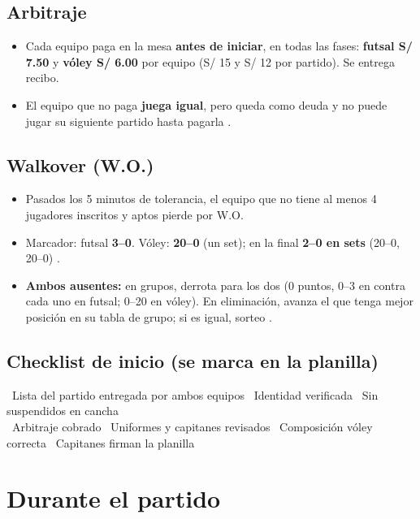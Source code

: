 \subsection{Arbitraje}
\begin{itemize}
	\item Cada equipo paga en la mesa \textbf{antes de iniciar}, en todas las fases: \textbf{futsal S/ 7.50} y \textbf{vóley S/ 6.00} por equipo (S/ 15 y S/ 12 por partido). Se entrega recibo.
	\item El equipo que no paga \textbf{juega igual}, pero queda como deuda y no puede jugar su siguiente partido hasta pagarla .
\end{itemize}

\subsection{Walkover (W.O.)}
\begin{itemize}
	\item Pasados los 5 minutos de tolerancia, el equipo que no tiene al menos 4 jugadores inscritos y aptos pierde por W.O.
	\item Marcador: futsal \textbf{3--0}. Vóley: \textbf{20--0} (un set); en la final \textbf{2--0 en sets} (20--0, 20--0) .
	\item \textbf{Ambos ausentes:} en grupos, derrota para los dos (0 puntos, 0--3 en contra cada uno en futsal; 0--20 en vóley). En eliminación, avanza el que tenga mejor posición en su tabla de grupo; si es igual, sorteo .
\end{itemize}

\subsection{Checklist de inicio (se marca en la planilla)}
\casilla\ Lista del partido entregada por ambos equipos \quad
\casilla\ Identidad verificada \quad
\casilla\ Sin suspendidos en cancha\\[3pt]
\casilla\ Arbitraje cobrado \quad
\casilla\ Uniformes y capitanes revisados \quad
\casilla\ Composición vóley correcta \quad
\casilla\ Capitanes firman la planilla

\section{Durante el partido}

